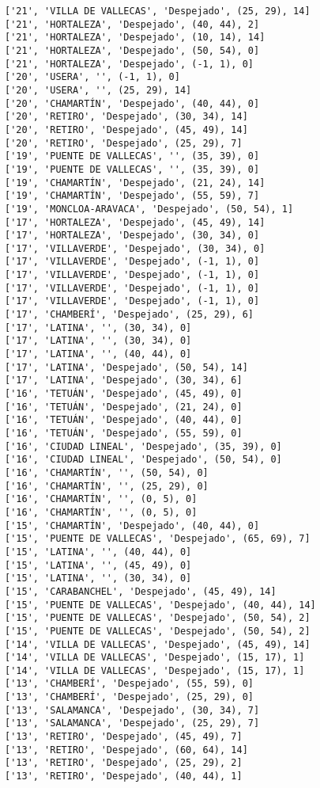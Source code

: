 \documentclass[11pt]{article}
\begin{document}
\begin{Verbatim}[commandchars=\\\{\}]
['21', 'VILLA DE VALLECAS', 'Despejado', (25, 29), 14]
['21', 'HORTALEZA', 'Despejado', (40, 44), 2]
['21', 'HORTALEZA', 'Despejado', (10, 14), 14]
['21', 'HORTALEZA', 'Despejado', (50, 54), 0]
['21', 'HORTALEZA', 'Despejado', (-1, 1), 0]
['20', 'USERA', '', (-1, 1), 0]
['20', 'USERA', '', (25, 29), 14]
['20', 'CHAMARTÍN', 'Despejado', (40, 44), 0]
['20', 'RETIRO', 'Despejado', (30, 34), 14]
['20', 'RETIRO', 'Despejado', (45, 49), 14]
['20', 'RETIRO', 'Despejado', (25, 29), 7]
['19', 'PUENTE DE VALLECAS', '', (35, 39), 0]
['19', 'PUENTE DE VALLECAS', '', (35, 39), 0]
['19', 'CHAMARTÍN', 'Despejado', (21, 24), 14]
['19', 'CHAMARTÍN', 'Despejado', (55, 59), 7]
['19', 'MONCLOA-ARAVACA', 'Despejado', (50, 54), 1]
['17', 'HORTALEZA', 'Despejado', (45, 49), 14]
['17', 'HORTALEZA', 'Despejado', (30, 34), 0]
['17', 'VILLAVERDE', 'Despejado', (30, 34), 0]
['17', 'VILLAVERDE', 'Despejado', (-1, 1), 0]
['17', 'VILLAVERDE', 'Despejado', (-1, 1), 0]
['17', 'VILLAVERDE', 'Despejado', (-1, 1), 0]
['17', 'VILLAVERDE', 'Despejado', (-1, 1), 0]
['17', 'CHAMBERÍ', 'Despejado', (25, 29), 6]
['17', 'LATINA', '', (30, 34), 0]
['17', 'LATINA', '', (30, 34), 0]
['17', 'LATINA', '', (40, 44), 0]
['17', 'LATINA', 'Despejado', (50, 54), 14]
['17', 'LATINA', 'Despejado', (30, 34), 6]
['16', 'TETUÁN', 'Despejado', (45, 49), 0]
['16', 'TETUÁN', 'Despejado', (21, 24), 0]
['16', 'TETUÁN', 'Despejado', (40, 44), 0]
['16', 'TETUÁN', 'Despejado', (55, 59), 0]
['16', 'CIUDAD LINEAL', 'Despejado', (35, 39), 0]
['16', 'CIUDAD LINEAL', 'Despejado', (50, 54), 0]
['16', 'CHAMARTÍN', '', (50, 54), 0]
['16', 'CHAMARTÍN', '', (25, 29), 0]
['16', 'CHAMARTÍN', '', (0, 5), 0]
['16', 'CHAMARTÍN', '', (0, 5), 0]
['15', 'CHAMARTÍN', 'Despejado', (40, 44), 0]
['15', 'PUENTE DE VALLECAS', 'Despejado', (65, 69), 7]
['15', 'LATINA', '', (40, 44), 0]
['15', 'LATINA', '', (45, 49), 0]
['15', 'LATINA', '', (30, 34), 0]
['15', 'CARABANCHEL', 'Despejado', (45, 49), 14]
['15', 'PUENTE DE VALLECAS', 'Despejado', (40, 44), 14]
['15', 'PUENTE DE VALLECAS', 'Despejado', (50, 54), 2]
['15', 'PUENTE DE VALLECAS', 'Despejado', (50, 54), 2]
['14', 'VILLA DE VALLECAS', 'Despejado', (45, 49), 14]
['14', 'VILLA DE VALLECAS', 'Despejado', (15, 17), 1]
['14', 'VILLA DE VALLECAS', 'Despejado', (15, 17), 1]
['13', 'CHAMBERÍ', 'Despejado', (55, 59), 0]
['13', 'CHAMBERÍ', 'Despejado', (25, 29), 0]
['13', 'SALAMANCA', 'Despejado', (30, 34), 7]
['13', 'SALAMANCA', 'Despejado', (25, 29), 7]
['13', 'RETIRO', 'Despejado', (45, 49), 7]
['13', 'RETIRO', 'Despejado', (60, 64), 14]
['13', 'RETIRO', 'Despejado', (25, 29), 2]
['13', 'RETIRO', 'Despejado', (40, 44), 1]

\end{Verbatim}
\end{document}
